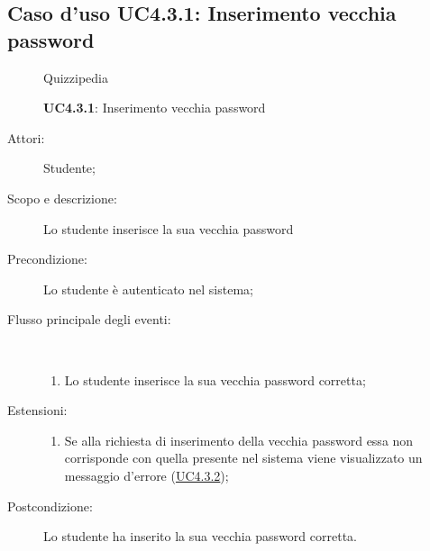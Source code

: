 \subsection{Caso d'uso UC4.3.1: Inserimento vecchia password}
	\begin{figure}[H]
		\centering
		\begin{resizedtikzpicture}{\textwidth}
		\begin{umlsystem}[x=0, fill=lightgray!20]{Quizzipedia}
		\end{umlsystem}
		\end{resizedtikzpicture}
		\caption{\textbf{UC4.3.1}: Inserimento vecchia password}
		\label{UC4.3.1}
	\end{figure}
\begin{description}
\item[Attori:] Studente;
\item[Scopo e descrizione:] Lo studente inserisce la sua vecchia password
      \item[Precondizione:] Lo studente è autenticato nel sistema;

        \item[Flusso principale degli eventi:] \ 
 \begin{enumerate}
          \item Lo studente inserisce la sua vecchia password corretta;

      \end{enumerate}
    \item[Estensioni:]
      \begin{enumerate}
          \item Se alla richiesta di inserimento della vecchia password essa non corrisponde con quella presente nel sistema viene visualizzato un messaggio d'errore (\hyperlink{UC4.3.2}{UC4.3.2});

      \end{enumerate}
    \item[Postcondizione:] Lo studente ha inserito la sua vecchia password corretta.
  \end{description}
\hypertarget{UC4.3.2}{}
